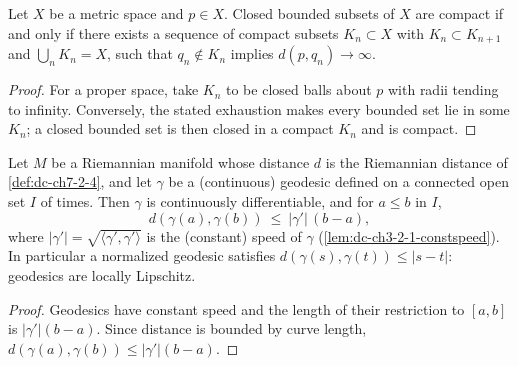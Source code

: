 \begin{lemma}

  \label{lem:dc-ch7-2-8-b-iff-e}


Let $X$ be a metric space and $p\in X$. Closed bounded subsets of $X$ are
  compact if and only if there exists a sequence of compact subsets
  $K_n\subset X$ with $K_n\subset K_{n+1}$ and $\bigcup_n K_n=X$, such that
  $q_n\notin K_n$ implies $d(p,q_n)\to\infty$.
\end{lemma}
\begin{proof}


\sketch For a proper space, take $K_n$ to be closed balls about $p$ with radii tending to infinity. Conversely, the stated exhaustion makes every bounded set lie in some $K_n$; a closed bounded set is then closed in a compact $K_n$ and is compact.
\end{proof}

\begin{lemma}

  \label{lem:dc-ch7-2-8-lipschitz}


Let $M$ be a Riemannian manifold whose distance $d$ is the Riemannian
  distance of \cref{def:dc-ch7-2-4}, and let $\gamma$ be a (continuous)
  geodesic defined on a connected open set $I$ of times. Then $\gamma$ is
  continuously differentiable, and for $a\le b$ in $I$,
  $$
  d(\gamma(a),\gamma(b))\ \le\ |\gamma'|\,(b-a),
  $$
  where $|\gamma'|=\sqrt{\langle\gamma',\gamma'\rangle}$ is the (constant)
  speed of $\gamma$ (\cref{lem:dc-ch3-2-1-constspeed}). In particular a
  normalized geodesic satisfies $d(\gamma(s),\gamma(t))\le|s-t|$: geodesics
  are locally Lipschitz.
\end{lemma}
\begin{proof}


\sketch Geodesics have constant speed and the length of their restriction to $[a,b]$ is $|\gamma'|(b-a)$. Since distance is bounded by curve length, $d(\gamma(a),\gamma(b))\le |\gamma'|(b-a)$.
\end{proof}


